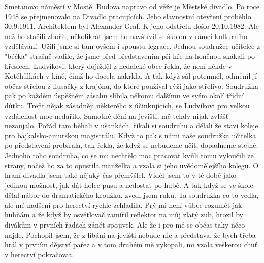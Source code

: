 
Smetanovo náměstí v Mostě. Budova napravo od věže je Městské divadlo.
Po roce 1948 se přejmenovalo na Divadlo pracujících. Jeho slavnostní
otevření proběhlo 30.9.1911. Architektem byl Alexander Graf. K jeho
odstřelu došlo 20.10.1982. Ale než ho stačili zbořit, několikrát jsem
ho navštívil se školou v rámci kulturního vzdělávání. Užili jsme si
tam ovšem i spoustu legrace. Jednou soudružce učitelce z "béčka"
strašně vadilo, že jsme před představením při hře na honěnou skákali
po křeslech. Ludvíkovi, který dojížděl z nedaleké obce řekla, že není
někde v Kotěhůlkách v kině, čímž ho docela nakrkla. A tak když sál
potemněl, odměnil jí občas střelou z flusačky z krajónu, do které
používal rýži jako střelivo. Soudružka pak po každém úspěšném zásahu
slíbila někomu dalšímu ve svém okolí třídní důtku. Trefit nějak
zásadněji některého z účinkujících, se Ludvíkovi pro velkou vzdálenost
moc nedařilo. Samotné dění na jevišti, mě tehdy nijak zvlášť
nezaujalo. Pořád tam běhali v ušankách, říkali si soudruhu a dělali že
staví koleje pro bajkalsko-amurskou magistrálu. Když to pak s námi
naše soudružka učitelka po představení probírala, tak řekla, že když
se nebudeme učit, dopadneme stejně. Jednoho toho soudruha, co se mu
nechtělo moc pracovat kvůli tomu vyloučili ze strany, načež ho za to
opustila manželka a vzala si jeho uvědomělejšího kolegu. O hraní
divadla jsem také nějaký čas přemýšlel. Viděl jsem to v té době jako
jedinou možnost, jak dát holce pusu a nedostat po hubě. A tak když se
ve škole dělal nábor do dramatického kroužku, zvedl jsem ruku. Ta
soudružka co to vedla, ale mé nadšení pro herectví rychle zchladila.
Prý mi není vůbec rozumět jak huhňám a že když by osvětlovač zamířil
reflektor na můj zlatý zub, hrozil by divákům v prvních řadách zánět
spojivek. Ale že i pro mě se občas taky něco najde. Pochopil jsem, že
z líbání na jevišti nebude nic a představa, že bych třeba hrál v
prvním dějství pařez a v tom druhém mě vykopali, mi vzala veškerou
chuť v herectví pokračovat.
